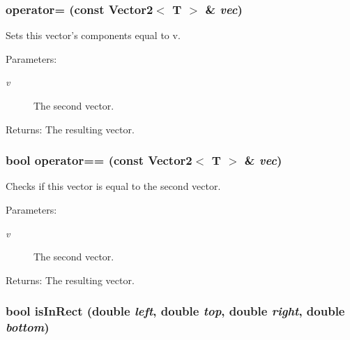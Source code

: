 \subsubsection{ operator= (const {\bf Vector2}$<$ T $>$ \& {\em vec})\hspace{0.3cm}{\tt  [inline]}}\label{classEngine_1_1Vector2_a50ad7e445496e46d08fafae87b253fb}


Sets this vector's components equal to v. \begin{Desc}
\item[Parameters:]
\begin{description}
\item[{\em v}]The second vector. \end{description}
\end{Desc}
\begin{Desc}
\item[Returns:]The resulting vector. \end{Desc}
\subsubsection{\setlength{\rightskip}{0pt plus 5cm}bool operator== (const {\bf Vector2}$<$ T $>$ \& {\em vec})\hspace{0.3cm}{\tt  [inline]}}\label{classEngine_1_1Vector2_ae45316d20b7e3b0e8ba4bc312b71966}


Checks if this vector is equal to the second vector. \begin{Desc}
\item[Parameters:]
\begin{description}
\item[{\em v}]The second vector. \end{description}
\end{Desc}
\begin{Desc}
\item[Returns:]The resulting vector. \end{Desc}
\subsubsection{\setlength{\rightskip}{0pt plus 5cm}bool isInRect (double {\em left}, double {\em top}, double {\em right}, double {\em bottom})\hspace{0.3cm}{\tt  [inline]}}\label{classEngine_1_1Vector2_2f90042f988f200130eb6ba7eb0c35ac}


